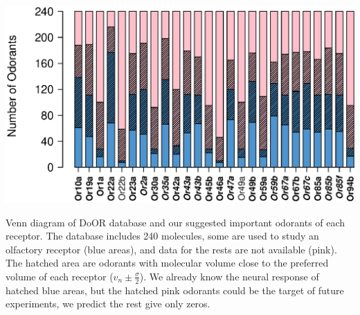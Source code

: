 \documentclass[a1paper,fontscale=0.6]{baposter} %
\newcommand{\numberofreceptors}{ 28 }
\begin{document}
\begin{poster}
{\begin{center}
\includegraphics[width= 0.75 \textwidth]{fig/odorant-suggest}
\end{center}	
Venn diagram of DoOR database and our suggested important odorants of each receptor.
The database includes 240 molecules, 
some are used to study an olfactory receptor (blue areas), 
and data for the rests are not available (pink).
The hatched area are odorants with molecular volume close to the preferred volume of each receptor
($v_n \pm \frac{\sigma}{2}$).
We already know the neural response of hatched blue areas, 
but the hatched pink odorants could be the target of future experiments, we predict the rest give only zeros.





}
\end{poster}
\end{document}
